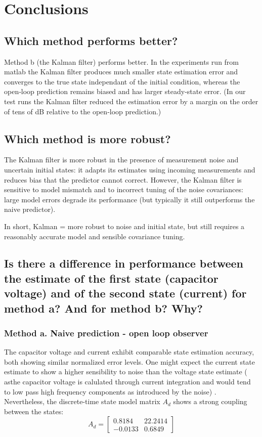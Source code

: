 \section{Conclusions}

\subsection{Which method performs better?}

Method b (the Kalman filter) performs better. 
In the experiments run from matlab the Kalman filter produces much smaller state estimation error and converges to the true state independant of the initial condition, 
whereas the open‑loop prediction remains biased and has larger steady‑state error. 
(In our test runs the Kalman filter reduced the estimation error by a margin on the order of tens of dB relative to the open‑loop prediction.)


\subsection{Which method is more robust?}

The Kalman filter is more robust in the presence of measurement noise and uncertain initial states: 
it adapts its estimates using incoming measurements and reduces bias that the predictor cannot correct.
However, the Kalman filter is sensitive to model mismatch and to incorrect tuning of the noise covariances: 
large model errors degrade its performance (but typically it still outperforms the naive predictor). 

In short, Kalman = more robust to noise and initial state, but still requires a reasonably accurate model and sensible covariance tuning.

\subsection{Is there a difference in performance between the estimate of the first state (capacitor voltage) and of the second state (current) for method a? And for method b? Why?}

\subsubsection{Method a. Naive prediction - open loop observer}

The capacitor voltage and current exhibit comparable state estimation accuracy, both showing similar normalized error levels.  One might expect the current state estimate to show a higher sensibility to noise than the voltage state estimate ( asthe capacitor voltage is calulated through current integration and would tend to low pass high frequency components as introduced by the noise) .
Nevertheless, the discrete-time state model matrix $A_d$ shows a strong coupling between the states:
\begin{equation}
A_d = \begin{bmatrix}
0.8184 & 22.2414 \\
-0.0133 & 0.6849
\end{bmatrix}
\end{equation}

